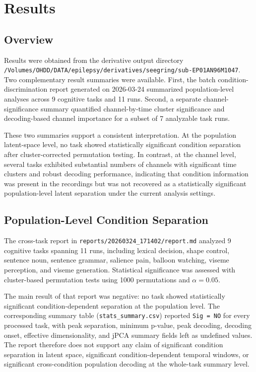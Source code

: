 \chapter{Results}

\section{Overview}

Results were obtained from the derivative output directory
\texttt{/Volumes/OHDD/DATA/epilepsy/derivatives/seegring/sub-EP01AN96M1047}.
Two complementary result summaries were available. First, the batch
condition-discrimination report generated on 2026-03-24 summarized
population-level analyses across 9 cognitive tasks and 11 runs.
Second, a separate channel-significance summary quantified
channel-by-time cluster significance and decoding-based channel
importance for a subset of 7 analyzable task runs.

These two summaries support a consistent interpretation. At the
population latent-space level, no task showed statistically significant
condition separation after cluster-corrected permutation testing. In
contrast, at the channel level, several tasks exhibited substantial
numbers of channels with significant time clusters and robust decoding
performance, indicating that condition information was present in the
recordings but was not recovered as a statistically significant
population-level latent separation under the current analysis settings.

\section{Population-Level Condition Separation}

The cross-task report in
\texttt{reports/20260324\_171402/report.md} analyzed 9 cognitive tasks
spanning 11 runs, including lexical decision, shape control, sentence
noun, sentence grammar, salience pain, balloon watching, viseme
perception, and viseme generation. Statistical significance was assessed
with cluster-based permutation tests using 1000 permutations and
$\alpha=0.05$.

The main result of that report was negative: no task showed
statistically significant condition-dependent separation at the
population level. The corresponding summary table
(\texttt{stats\_summary.csv}) reported \texttt{Sig = NO} for every
processed task, with peak separation, minimum p-value, peak decoding,
decoding onset, effective dimensionality, and jPCA summary fields left
as undefined values. The report therefore does not support any claim of
significant condition separation in latent space, significant
condition-dependent temporal windows, or significant cross-condition
population decoding at the whole-task summary level.

